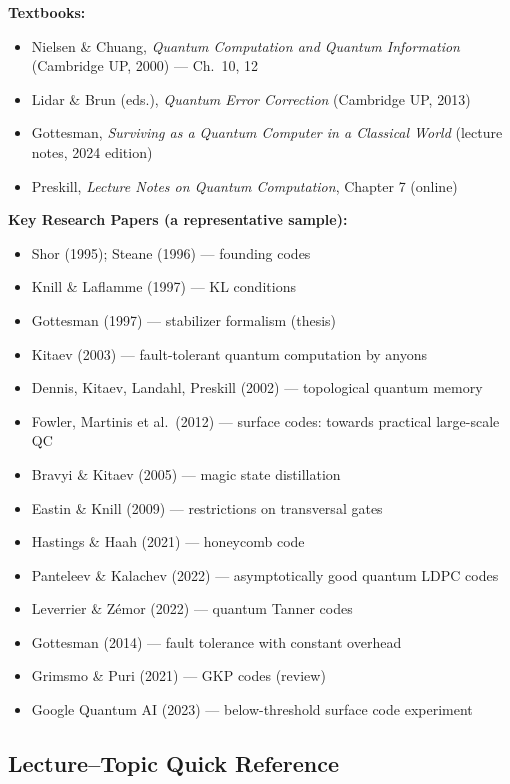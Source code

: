 \documentclass[12pt,oneside]{article}
\begin{document}
\noindent\textbf{Textbooks:}
\begin{itemize}[itemsep=2pt]
  \item Nielsen \& Chuang, \textit{Quantum Computation and Quantum Information} (Cambridge UP, 2000) --- Ch.\ 10, 12
  \item Lidar \& Brun (eds.), \textit{Quantum Error Correction} (Cambridge UP, 2013)
  \item Gottesman, \textit{Surviving as a Quantum Computer in a Classical World} (lecture notes, 2024 edition)
  \item Preskill, \textit{Lecture Notes on Quantum Computation}, Chapter 7 (online)
\end{itemize}

\noindent\textbf{Key Research Papers (a representative sample):}
\begin{itemize}[itemsep=2pt, label={$\triangleright$}]
  \item Shor (1995); Steane (1996) --- founding codes
  \item Knill \& Laflamme (1997) --- KL conditions
  \item Gottesman (1997) --- stabilizer formalism (thesis)
  \item Kitaev (2003) --- fault-tolerant quantum computation by anyons
  \item Dennis, Kitaev, Landahl, Preskill (2002) --- topological quantum memory
  \item Fowler, Martinis et al.\ (2012) --- surface codes: towards practical large-scale QC
  \item Bravyi \& Kitaev (2005) --- magic state distillation
  \item Eastin \& Knill (2009) --- restrictions on transversal gates
  \item Hastings \& Haah (2021) --- honeycomb code
  \item Panteleev \& Kalachev (2022) --- asymptotically good quantum LDPC codes
  \item Leverrier \& Z{\'e}mor (2022) --- quantum Tanner codes
  \item Gottesman (2014) --- fault tolerance with constant overhead
  \item Grimsmo \& Puri (2021) --- GKP codes (review)
  \item Google Quantum AI (2023) --- below-threshold surface code experiment
\end{itemize}

\subsection*{Lecture--Topic Quick Reference}
\end{document}
